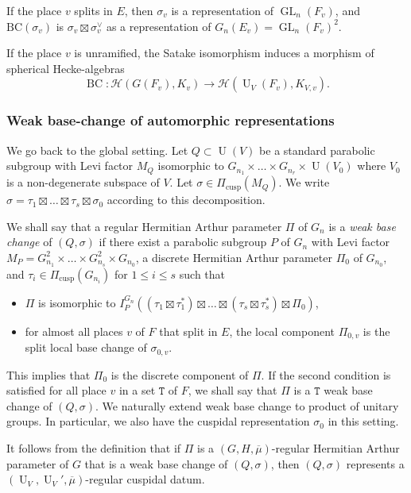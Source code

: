 \documentclass[letterpaper,11pt]{amsart}
\newcommand{\cH}{\mathcal{H}}
\newcommand{\tT}{\mathtt{T}}
\newcommand{\<}{\negthickspace}
\DeclareMathOperator{\GL}{GL}
\DeclareMathOperator{\U}{U}
\DeclareMathOperator{\BC}{BC}
\DeclareMathOperator{\cusp}{cusp}
\theoremstyle{definition}
\theoremstyle{plain}
\theoremstyle{remark}
\numberwithin{equation}{section}
\begin{document}
If the place $v$ splits in $E$, then $\sigma_v$ is a representation of $\GL_n(F_v)$, and $\mathrm{BC}(\sigma_v)$ is $\sigma_{v} \boxtimes \sigma_{v}^\vee$ as a representation of $G_n(E_v)=\GL_n(F_v)^2$.

If the place $v$ is unramified, the Satake isomorphism induces a morphism of spherical Hecke-algebras 
\begin{equation}
    \label{eq:Hecke_BC}
    \BC : \cH(G(F_v),K_v) \to \cH(\U_V(F_v),K_{V,v}).
\end{equation}

\subsubsection{Weak base-change of automorphic representations}

We go back to the global setting. Let $Q
\subset \U(V)$ be a standard parabolic subgroup with Levi factor $M_Q$ isomorphic to $G_{n_1} \times \hdots \times G_{n_r} \times \U(V_0)$ where $V_0$ is a non-degenerate subspace of $V$. Let $\sigma \in \Pi_{\cusp}(M_Q)$. We write $\sigma=\tau_1 \boxtimes \hdots \boxtimes \tau_s \boxtimes \sigma_0$ according to this decomposition. 

We shall say that a regular Hermitian Arthur parameter $\Pi$ of $G_n$ is a \emph{weak base change} of $(Q,\sigma)$ if there exist a parabolic subgroup $P$ of $G_n$ with Levi factor $M_P=G_{n_1}^2 \times \hdots \times G_{n_s}^2 \times G_{n_0}$, a discrete Hermitian Arthur parameter $\Pi_0$ of $G_{n_0}$, and $\tau_i \in \Pi_{\cusp}(G_{n_i})$ for $1 \leq i \leq s$ such that
\begin{itemize}
    \item $\Pi$ is isomorphic to $I_P^{G_n}((\tau_1 \boxtimes \tau_1^*) \boxtimes \hdots \boxtimes (\tau_s \boxtimes \tau_s^*) \boxtimes \Pi_0)$,
    \item for almost all places $v$ of $F$ that split in $E$, the local component $\Pi_{0,v}$ is the split local base change of
        $\sigma_{0,v}$.
\end{itemize}
This implies that $\Pi_0$ is the discrete component of $\Pi$. If the second condition is satisfied for all place $v$ in a set $\tT$ of $F$, we shall say that $\Pi$ is a $\tT$ weak base change of $(Q,\sigma)$. We naturally extend weak base change to product of unitary groups. In particular, we also have the cuspidal representation $\sigma_0$ in this setting. 

It follows from the definition that if $\Pi$ is a $(G,H,\overline{\mu})$-regular Hermitian Arthur parameter of $G$ that is a weak base change of $(Q,\sigma)$, then $(Q,\sigma)$ represents a $(\U_V,\U_V',\overline{\mu})$-regular cuspidal datum.
\end{document}

